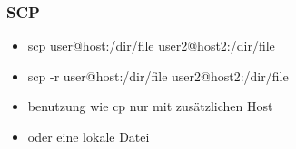 \begin{frame}
\frametitle{SCP}
\begin{itemize}
\item scp user@host:/dir/file user2@host2:/dir/file
\pause
\item scp -r user@host:/dir/file user2@host2:/dir/file
\pause
\item benutzung wie cp nur mit zusätzlichen Host
\pause
\item oder eine lokale Datei
\end{itemize}
\end{frame}